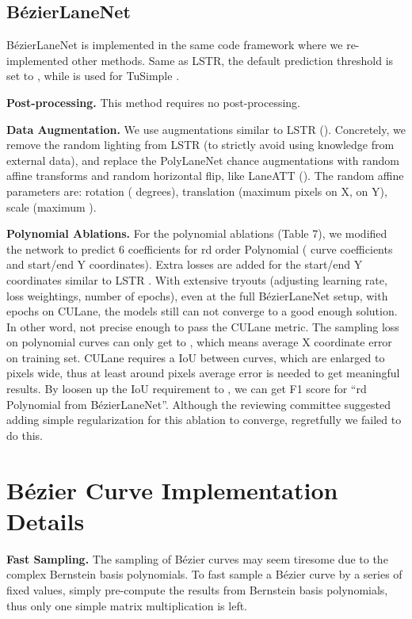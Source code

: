 \documentclass[10pt,twocolumn,letterpaper]{article}
\begin{document}
\subsection{BézierLaneNet}
\label{subsec:bezierlanenet}

BézierLaneNet is implemented in the same code framework where we re-implemented other methods. Same as LSTR, the default prediction threshold is set to , while  is used for TuSimple \cite{tusimple}.

\noindent \textbf{Post-processing.} This method requires no post-processing.

\noindent \textbf{Data Augmentation.} We use augmentations similar to LSTR (). Concretely, we remove the random lighting from LSTR (to strictly avoid using knowledge from external data), and replace the PolyLaneNet  chance augmentations with random affine transforms and random horizontal flip, like LaneATT (). The random affine parameters are: rotation ( degrees), translation (maximum  pixels on X,  on Y), scale (maximum ).

\noindent \textbf{Polynomial Ablations.} For the polynomial ablations (Table 7), we modified the network to predict 6 coefficients for rd order Polynomial ( curve coefficients and start/end Y coordinates). Extra  losses are added for the start/end Y coordinates similar to LSTR \cite{liu2021end}. With extensive tryouts (adjusting learning rate, loss weightings, number of epochs), even at the full BézierLaneNet setup, with  epochs on CULane, the models still can not converge to a good enough solution. In other word, not precise enough to pass the CULane metric. The sampling loss on polynomial curves can only get to , which means  average X coordinate error on training set. 
CULane requires a  IoU between curves, which are enlarged to  pixels wide, thus at least around  pixels average error is needed to get meaningful results. By loosen up the IoU requirement to , we can get F1 score  for ``rd Polynomial from BézierLaneNet''. Although the reviewing committee suggested adding simple regularization for this ablation to converge, regretfully we failed to do this.


\section{Bézier Curve Implementation Details}
\label{sec:transforms}

\noindent \textbf{Fast Sampling.} The sampling of Bézier curves may seem tiresome due to the complex Bernstein basis polynomials. To fast sample a Bézier curve by a series of fixed  values, simply pre-compute the results from Bernstein basis polynomials, thus only one simple matrix multiplication is left.
\end{document}

